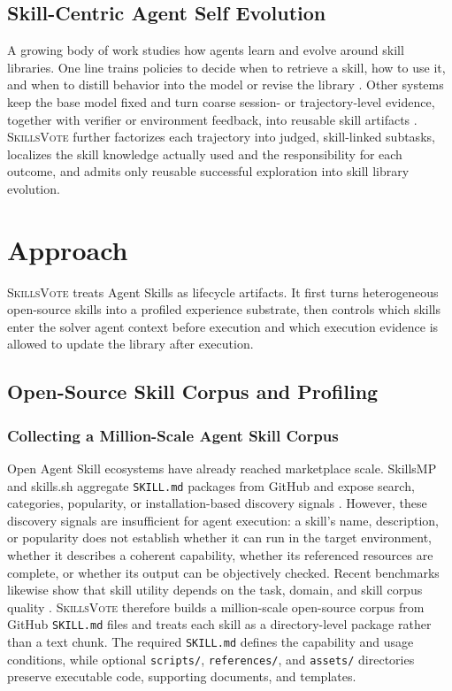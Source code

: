 \documentclass{llmxive}
\providecommand{\ours}{\textsc{SkillsVote}\xspace}
\begin{document}
\subsection{Skill-Centric Agent Self Evolution}
A growing body of work studies how agents learn and evolve around skill libraries. One line trains policies to decide when to retrieve a skill, how to use it, and when to distill behavior into the model or revise the library \citep{xia2026skillrl,wang2025reinforcement,xia2026metaclaw,wang2026openclaw,lu2026skill0,shi2026skill1,ouyang2026skillos}. Other systems keep the base model fixed and turn coarse session- or trajectory-level evidence, together with verifier or environment feedback, into reusable skill artifacts \citep{ni2026trace2skill,alzubi2026evoskill,zhang2026coevoskills,ma2026skillclaw,wang2026skillx,yang2026autoskill,si2026context,zhang2026skillflow,zhou2026memento,skillpro2026,gong2026skillmoo,xu2026multi}. \ours further factorizes each trajectory into judged, skill-linked subtasks, localizes the skill knowledge actually used and the responsibility for each outcome, and admits only reusable successful exploration into skill library evolution.


\section{Approach}
\ours treats Agent Skills as lifecycle artifacts. It first turns heterogeneous open-source skills into a profiled experience substrate, then controls which skills enter the solver agent context before execution and which execution evidence is allowed to update the library after execution.

\subsection{Open-Source Skill Corpus and Profiling}

\subsubsection{Collecting a Million-Scale Agent Skill Corpus}
Open Agent Skill ecosystems have already reached marketplace scale. SkillsMP and skills.sh aggregate \texttt{SKILL.md} packages from GitHub and expose search, categories, popularity, or installation-based discovery signals \citep{skillsmp2026,skillssh2026}. However, these discovery signals are insufficient for agent execution: a skill's name, description, or popularity does not establish whether it can run in the target environment, whether it describes a coherent capability, whether its referenced resources are complete, or whether its output can be objectively checked. Recent benchmarks likewise show that skill utility depends on the task, domain, and skill corpus quality \citep{li2026skillsbench,zhang2026skillflow}. \ours therefore builds a million-scale open-source corpus from GitHub \texttt{SKILL.md} files and treats each skill as a directory-level package rather than a text chunk. The required \texttt{SKILL.md} defines the capability and usage conditions, while optional \texttt{scripts/}, \texttt{references/}, and \texttt{assets/} directories preserve executable code, supporting documents, and templates.
\end{document}
